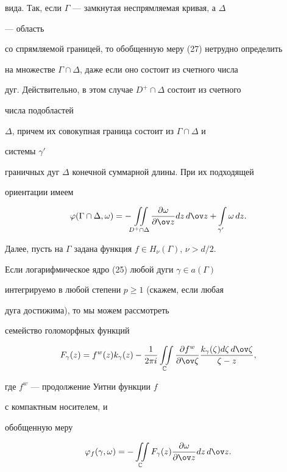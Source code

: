 вида. Так, если $\Gamma$ --- замкнутая неспрямляемая кривая, а $\Delta$ 


--- область 


со спрямляемой границей, то обобщенную меру (27) нетрудно определить 


на множестве $\Gamma\cap\Delta$, даже если оно состоит из счетного числа 


дуг. Действительно, в этом случае $D^+\cap\Delta$ состоит из счетного 


числа подобластей 


$\Delta$, причем их совокупная граница состоит из $\Gamma\cap\Delta$ и 


системы $\gamma'$ 


граничных дуг $\Delta$ конечной суммарной длины. При их подходящей 


ориентации имеем 


$$ 


\varphi(\Gamma\cap\Delta,\omega)=-\iint\limits_{D^+\cap\Delta} 


\myfrac{\omega}{\ov z}dz\,d\ov z+\intl_{\gamma'}\omega\,dz. 


$$ 


Далее, пусть на $\Gamma$ задана функция $f\in H_\nu(\Gamma)$, $\nu>d/2$. 


Если логарифмическое ядро (25) любой дуги $\gamma\in a(\Gamma)$ 


интегрируемо в любой степени $p\ge 1$ (скажем, если любая 


дуга достижима), то мы можем рассмотреть 


семейство голоморфных функций 


$$ 


F_\gamma(z)=f^w(z)k_\gamma(z)-\frac{1}{2\pi i} 


\iint\limits_{\Bbb C}\myfrac{f^w}{\ov\zeta} 


\frac{k_\gamma(\zeta)d\zeta\,d\ov\zeta}{\zeta-z}, 


$$ 


где $f^w$ --- продолжение Уитни функции $f$ 


с компактным носителем, и 


обобщенную меру 


\begin{equation} 


\varphi_f(\gamma,\omega)=-\iint\limits_{\Bbb C}F_\gamma(z) 


\myfrac{\omega}{\ov z}dz\,d\ov z. 


\end{equation} 


